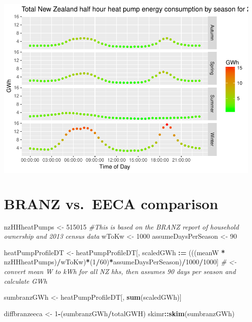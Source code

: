 \documentclass[]{article}
\newenvironment{Shaded}{\begin{snugshade}}{\end{snugshade}}
\newcommand{\KeywordTok}[1]{\textcolor[rgb]{0.13,0.29,0.53}{\textbf{#1}}}
\newcommand{\DecValTok}[1]{\textcolor[rgb]{0.00,0.00,0.81}{#1}}
\newcommand{\StringTok}[1]{\textcolor[rgb]{0.31,0.60,0.02}{#1}}
\newcommand{\CommentTok}[1]{\textcolor[rgb]{0.56,0.35,0.01}{\textit{#1}}}
\newcommand{\OperatorTok}[1]{\textcolor[rgb]{0.81,0.36,0.00}{\textbf{#1}}}
\newcommand{\ErrorTok}[1]{\textcolor[rgb]{0.64,0.00,0.00}{\textbf{#1}}}
\newcommand{\NormalTok}[1]{#1}
\begin{document}
\includegraphics{heatPumpProfileAnalysis_files/figure-latex/aggregateMethod2-1.pdf}

\section{BRANZ vs.~EECA comparison}\label{branz-vs.eeca-comparison}

\begin{Shaded}
\begin{Highlighting}[]
\NormalTok{nzHHheatPumps <-}\StringTok{ }\DecValTok{515015} \CommentTok{#This is based on the BRANZ report of household ownership and 2013 census data}
\NormalTok{wToKw <-}\StringTok{ }\DecValTok{1000}
\NormalTok{assumeDaysPerSeason <-}\StringTok{ }\DecValTok{90}

\NormalTok{heatPumpProfileDT <-}\StringTok{ }\NormalTok{heatPumpProfileDT[, scaledGWh }\OperatorTok{:}\ErrorTok{=}\StringTok{ }\NormalTok{(((meanW }\OperatorTok{*}\StringTok{ }\NormalTok{nzHHheatPumps)}\OperatorTok{/}\NormalTok{wToKw)}\OperatorTok{*}\NormalTok{(}\DecValTok{1}\OperatorTok{/}\DecValTok{60}\NormalTok{)}\OperatorTok{*}\NormalTok{assumeDaysPerSeason)}\OperatorTok{/}\DecValTok{1000}\OperatorTok{/}\DecValTok{1000}\NormalTok{] }\CommentTok{# <- convert mean W to kWh for all NZ hhs, then assumes 90 days per season and calculate GWh}

\NormalTok{sumbranzGWh <-}\StringTok{ }\NormalTok{heatPumpProfileDT[, }\KeywordTok{sum}\NormalTok{(scaledGWh)]}


\NormalTok{diffbranzeeca <-}\StringTok{ }\DecValTok{1}\OperatorTok{-}\NormalTok{(sumbranzGWh}\OperatorTok{/}\NormalTok{totalGWH)}
\NormalTok{skimr}\OperatorTok{::}\KeywordTok{skim}\NormalTok{(sumbranzGWh)}
\end{Highlighting}
\end{Shaded}
\end{document}
